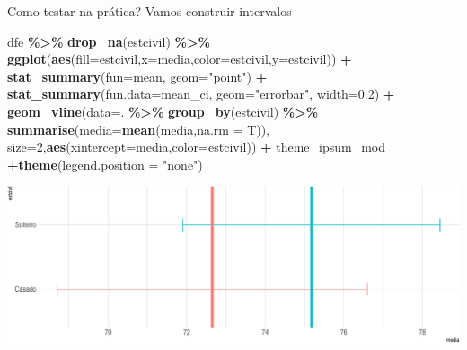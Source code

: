 \documentclass[
  9pt,
  ignorenonframetext,
  aspectratio=169]{beamer}
\newenvironment{Shaded}{\begin{snugshade}}{\end{snugshade}}
\newcommand{\DataTypeTok}[1]{\textcolor[rgb]{0.13,0.29,0.53}{#1}}
\newcommand{\DecValTok}[1]{\textcolor[rgb]{0.00,0.00,0.81}{#1}}
\newcommand{\FloatTok}[1]{\textcolor[rgb]{0.00,0.00,0.81}{#1}}
\newcommand{\KeywordTok}[1]{\textcolor[rgb]{0.13,0.29,0.53}{\textbf{#1}}}
\newcommand{\NormalTok}[1]{#1}
\newcommand{\OperatorTok}[1]{\textcolor[rgb]{0.81,0.36,0.00}{\textbf{#1}}}
\newcommand{\StringTok}[1]{\textcolor[rgb]{0.31,0.60,0.02}{#1}}
\begin{document}
\begin{frame}[fragile]{Como testar na prática? Vamos construir
intervalos}
\protect\hypertarget{como-testar-na-pruxe1tica-vamos-construir-intervalos}{}
\begin{Shaded}
\begin{Highlighting}[]
\NormalTok{dfe }\OperatorTok{\%\textgreater{}\%}\StringTok{ }\KeywordTok{drop\_na}\NormalTok{(estcivil) }\OperatorTok{\%\textgreater{}\%}\StringTok{ }
\StringTok{  }\KeywordTok{ggplot}\NormalTok{(}\KeywordTok{aes}\NormalTok{(}\DataTypeTok{fill=}\NormalTok{estcivil,}\DataTypeTok{x=}\NormalTok{media,}\DataTypeTok{color=}\NormalTok{estcivil,}\DataTypeTok{y=}\NormalTok{estcivil)) }\OperatorTok{+}
\StringTok{  }\KeywordTok{stat\_summary}\NormalTok{(}\DataTypeTok{fun=}\NormalTok{mean, }\DataTypeTok{geom=}\StringTok{"point"}\NormalTok{) }\OperatorTok{+}\StringTok{ }
\StringTok{  }\KeywordTok{stat\_summary}\NormalTok{(}\DataTypeTok{fun.data=}\NormalTok{mean\_ci, }\DataTypeTok{geom=}\StringTok{"errorbar"}\NormalTok{, }\DataTypeTok{width=}\FloatTok{0.2}\NormalTok{) }\OperatorTok{+}
\StringTok{  }\KeywordTok{geom\_vline}\NormalTok{(}\DataTypeTok{data=}\NormalTok{. }\OperatorTok{\%\textgreater{}\%}\StringTok{ }\KeywordTok{group\_by}\NormalTok{(estcivil) }\OperatorTok{\%\textgreater{}\%}\StringTok{ }\KeywordTok{summarise}\NormalTok{(}\DataTypeTok{media=}\KeywordTok{mean}\NormalTok{(media,}\DataTypeTok{na.rm =}\NormalTok{ T)),}
             \DataTypeTok{size=}\DecValTok{2}\NormalTok{,}\KeywordTok{aes}\NormalTok{(}\DataTypeTok{xintercept=}\NormalTok{media,}\DataTypeTok{color=}\NormalTok{estcivil)) }\OperatorTok{+}\StringTok{ }
\StringTok{  }\NormalTok{theme\_ipsum\_mod }\OperatorTok{+}\KeywordTok{theme}\NormalTok{(}\DataTypeTok{legend.position =} \StringTok{"none"}\NormalTok{)}
\end{Highlighting}
\end{Shaded}

\includegraphics{aula_11_files/figure-beamer/unnamed-chunk-3-1.pdf}
\end{frame}
\end{document}
